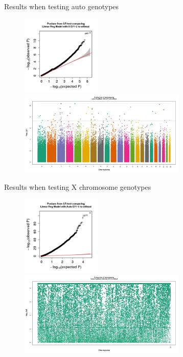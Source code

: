 \documentclass{beamer}
\begin{document}
\begin{frame}{Results when testing auto genotypes}
\begin{figure}
\includegraphics[height=3.8cm]{qqPlot_autoSNPs.png}
\includegraphics[width=8cm]{manhPlot_autoSNPs.png}
\end{figure}
\end{frame}

\begin{frame}{Results when testing X chromosome genotypes}
\begin{figure}
\includegraphics[height=3.8cm]{qqPlot_xSNPs.png}
\includegraphics[width=8cm]{manhPlot_xSNPs.png}
\end{figure}
\end{frame}
\end{document}
